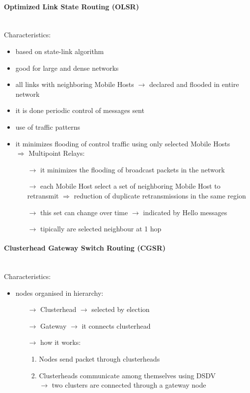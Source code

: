 \paragraph{Optimized Link State Routing (OLSR)}\mbox{}\\[0.2cm]
Characteristics:
\begin{itemize}
    \item based on state-link algorithm
    \item good for large and dense networks
    \item all links with neighboring Mobile Hosts $\rightarrow$ declared and flooded in entire network
    \item it is done periodic control of messages sent
    \item use of traffic patterns
    \item it minimizes flooding of control traffic using only selected Mobile Hosts\\[0.2cm]
    $\Rightarrow$ Multipoint Relays:
    \begin{itemize}
        \item[$\rightarrow$] it minimizes the flooding of broadcast packets in the network
        \item[$\rightarrow$] each Mobile Host select a set of neighboring Mobile Host to retransmit $\Rightarrow$ reduction of duplicate retransmissions in the same region
        \item[$\rightarrow$] this set can change over time $\rightarrow$ indicated by Hello messages
        \item[$\rightarrow$] tipically are selected neighbour at 1 hop 
    \end{itemize}
\end{itemize}

\paragraph{Clusterhead Gateway Switch Routing (CGSR)}\mbox{}\\[0.2cm]
Characteristics:
\begin{itemize}
    \item nodes organised in hierarchy:
    \begin{itemize}
        \item[$\rightarrow$] Clusterhead $\rightarrow$ selected by election
        \item[$\rightarrow$] Gateway $\rightarrow$ it connects clusterhead
        \item[$\rightarrow$] how it works:
        \begin{enumerate}
            \item Nodes send packet through clusterheads
            \item Clusterheads communicate among themselves using DSDV\\
            $\rightarrow$ two clusters are connected through a gateway node
        \end{enumerate}
    \end{itemize}
\end{itemize}
